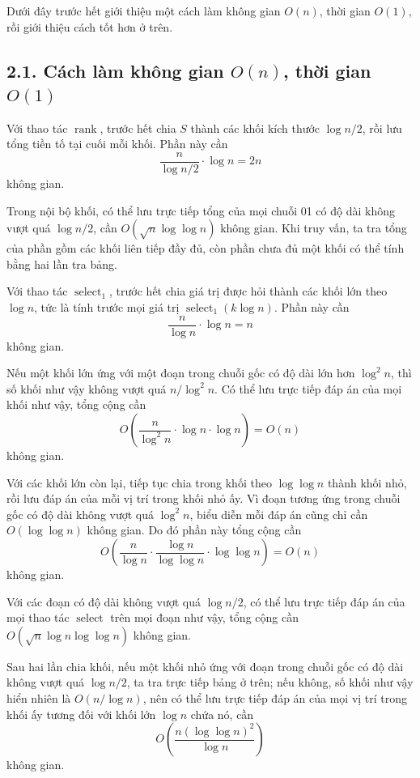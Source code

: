\documentclass[11pt]{article}
\DeclareMathOperator{\rank}{rank}
\begin{document}
Dưới đây trước hết giới thiệu một cách làm không gian \(O(n)\), thời gian
\(O(1)\), rồi giới thiệu cách tốt hơn ở trên.

\subsection*{2.1. Cách làm không gian \texorpdfstring{\(O(n)\)}{O(n)}, thời gian \texorpdfstring{\(O(1)\)}{O(1)}}

Với thao tác \(\rank\), trước hết chia \(S\) thành các khối kích thước
\(\log n/2\), rồi lưu tổng tiền tố tại cuối mỗi khối. Phần này cần
\[
  \frac{n}{\log n/2}\cdot\log n=2n
\]
không gian.

Trong nội bộ khối, có thể lưu trực tiếp tổng của mọi chuỗi 01 có độ dài không
vượt quá \(\log n/2\), cần \(O(\sqrt n\log\log n)\) không gian. Khi truy vấn,
ta tra tổng của phần gồm các khối liên tiếp đầy đủ, còn phần chưa đủ một khối
có thể tính bằng hai lần tra bảng.

Với thao tác \(\operatorname{select}_1\), trước hết chia giá trị được hỏi
thành các khối lớn theo \(\log n\), tức là tính trước mọi giá trị
\(\operatorname{select}_1(k\log n)\). Phần này cần
\[
  \frac{n}{\log n}\cdot\log n=n
\]
không gian.

Nếu một khối lớn ứng với một đoạn trong chuỗi gốc có độ dài lớn hơn
\(\log^2 n\), thì số khối như vậy không vượt quá \(n/\log^2 n\). Có thể lưu
trực tiếp đáp án của mọi khối như vậy, tổng cộng cần
\[
  O\left(\frac{n}{\log^2 n}\cdot\log n\cdot\log n\right)=O(n)
\]
không gian.

Với các khối lớn còn lại, tiếp tục chia trong khối theo \(\log\log n\) thành
khối nhỏ, rồi lưu đáp án của mỗi vị trí trong khối nhỏ ấy. Vì đoạn tương ứng
trong chuỗi gốc có độ dài không vượt quá \(\log^2 n\), biểu diễn mỗi đáp án
cũng chỉ cần \(O(\log\log n)\) không gian. Do đó phần này tổng cộng cần
\[
  O\left(\frac{n}{\log n}\cdot
  \frac{\log n}{\log\log n}\cdot\log\log n\right)=O(n)
\]
không gian.

Với các đoạn có độ dài không vượt quá \(\log n/2\), có thể lưu trực tiếp đáp
án của mọi thao tác \(\operatorname{select}\) trên mọi đoạn như vậy, tổng cộng
cần \(O(\sqrt n\log n\log\log n)\) không gian.

Sau hai lần chia khối, nếu một khối nhỏ ứng với đoạn trong chuỗi gốc có độ dài
không vượt quá \(\log n/2\), ta tra trực tiếp bảng ở trên; nếu không, số khối
như vậy hiển nhiên là \(O(n/\log n)\), nên có thể lưu trực tiếp đáp án của mọi
vị trí trong khối ấy tương đối với khối lớn \(\log n\) chứa nó, cần
\[
  O\left(\frac{n(\log\log n)^2}{\log n}\right)
\]
không gian.
\end{document}
